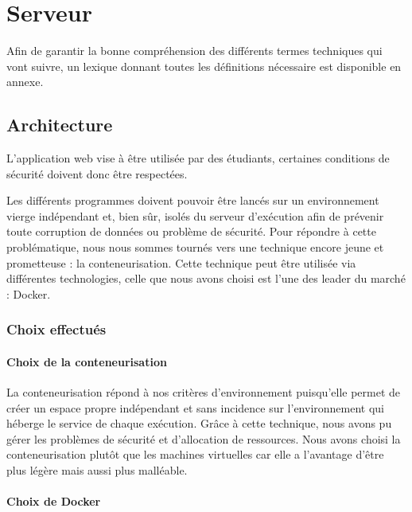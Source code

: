 \chapter{Serveur}

\par Afin de garantir la bonne compréhension des différents termes techniques qui vont suivre, un lexique donnant toutes les définitions nécessaire est disponible en annexe.

\section{Architecture}

\par L’application web vise à être utilisée par des étudiants, certaines conditions de sécurité doivent donc être respectées.

\par Les différents programmes doivent pouvoir être lancés sur un environnement vierge indépendant et, bien sûr, isolés du serveur d’exécution afin de prévenir toute corruption de données ou problème de sécurité. Pour répondre à cette problématique, nous nous sommes tournés vers une technique encore jeune et prometteuse : la conteneurisation. Cette technique peut être utilisée via différentes technologies, celle que nous avons choisi est l’une des leader du marché : Docker.

\subsection{Choix effectués}

\subsubsection{Choix de la conteneurisation}


\par La conteneurisation répond à nos critères d’environnement puisqu’elle permet de créer un espace propre indépendant et sans incidence sur l’environnement qui héberge le \gls{service} de chaque exécution. Grâce à cette technique, nous avons pu gérer les problèmes de sécurité et d’allocation de ressources. Nous avons choisi la conteneurisation plutôt que les machines virtuelles car elle a l’avantage d’être plus légère mais aussi plus malléable.

\subsubsection{Choix de Docker}

